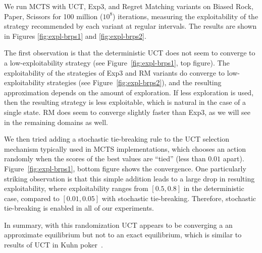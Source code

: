 We run MCTS with UCT, Exp3, and Regret Matching variants on Biased Rock, Paper, Scissors
for 100 million ($10^8$) iterations, measuring the exploitability of the strategy recommended by 
each variant at regular intervals. The results are shown in Figures \ref{fig:expl-brps1} and \ref{fig:expl-brps2}.


The first observation is that the deterministic UCT does not seem to converge to a low-exploitability strategy (see Figure~\ref{fig:expl-brps1}, top figure). The exploitability of the strategies of 
Exp3 and RM variants do converge to low-exploitability strategies (see Figure~\ref{fig:expl-brps2}), and the resulting approximation depends on the amount of exploration. 
If less exploration is used, then the resulting strategy is less exploitable, which is natural in the case of a single state. RM does seem to 
converge slightly faster than Exp3, as we will see in the remaining domains as well. 

We then tried adding a stochastic tie-breaking rule to the UCT selection mechanism typically used in MCTS implementations, which chooses an 
action randomly when the scores of the best values are ``tied'' (less than $0.01$ apart).
Figure~\ref{fig:expl-brps1}, bottom figure shows the convergence.
One particularly striking observation is that this simple addition leads to a large drop in resulting exploitability, where exploitability
ranges from $[0.5,0.8]$ in the deterministic case, compared to $[0.01,0.05]$ with stochastic tie-breaking. Therefore, stochastic tie-breaking is 
enabled in all of our experiments. 

In summary, with this randomization UCT appears to be converging a an approximate equilibrium but not to an 
exact equilibrium, which is similar to results of UCT in Kuhn poker~\cite{Ponsen11Computing}.



